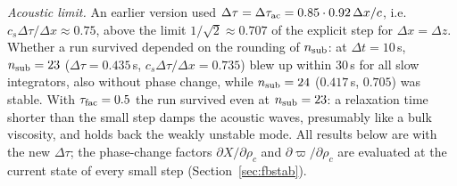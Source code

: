 \documentclass[11pt,a4paper]{article}
\newcommand{\dtau}{\Delta\tau}
\newcommand{\dt}{\Delta t}
\newcommand{\pv}{\varpi}      %
\begin{document}
\emph{Acoustic limit.} An earlier version used $\dtau=\dtau_{\rm ac}=0.85\cdot0.92\,\Delta x/c$, i.e.\ $c_s\dtau/\Delta x\approx0.75$,
above the limit $1/\sqrt2\approx0.707$ of the explicit step for $\Delta x=\Delta z$. Whether a run survived depended on the rounding
of $n_{\rm sub}$: at $\dt=10$\,s, $n_{\rm sub}=23$ ($\dtau=0.435$\,s, $c_s\dtau/\Delta x=0.735$) blew up within 30\,s for all slow
integrators, also without phase change, while $n_{\rm sub}=24$ ($0.417$\,s, $0.705$) was stable. With $\tau_{\rm fac}=0.5$ the run
survived even at $n_{\rm sub}=23$: a relaxation time shorter than the small step damps the acoustic waves,
presumably like a bulk viscosity, and holds back the weakly unstable mode. All results below are with the
new $\dtau$; the phase-change factors $\partial X/\partial\rho_c$ and $\partial\pv/\partial\rho_c$ are evaluated at the current state of
every small step (Section~\ref{sec:fbstab}).
\end{document}
